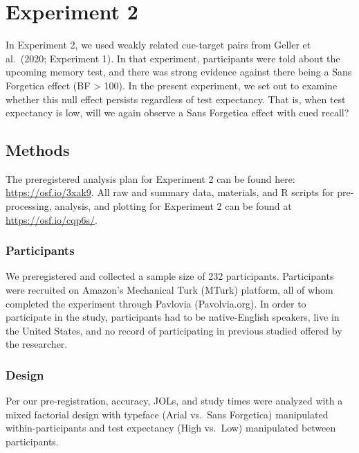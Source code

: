 \documentclass[
  english,
  jou]{apa7}
\begin{document}
\hypertarget{experiment-2}{%
\section{Experiment 2}\label{experiment-2}}

In Experiment 2, we used weakly related cue-target pairs from Geller et al.~(2020; Experiment 1). In that experiment, participants were told about the upcoming memory test, and there was strong evidence against there being a Sans Forgetica effect (BF \textgreater{} 100). In the present experiment, we set out to examine whether this null effect persists regardless of test expectancy. That is, when test expectancy is low, will we again observe a Sans Forgetica effect with cued recall?

\hypertarget{methods}{%
\subsection{Methods}\label{methods}}

The preregistered analysis plan for Experiment 2 can be found here: \url{https://osf.io/3xak9}. All raw and summary data, materials, and R scripts for pre-processing, analysis, and plotting for Experiment 2 can be found at \url{https://osf.io/cqp6s/}.

\hypertarget{participants-1}{%
\subsubsection{Participants}\label{participants-1}}

We preregistered and collected a sample size of 232 participants. Participants were recruited on Amazon's Mechanical Turk (MTurk) platform, all of whom completed the experiment through Pavlovia (Pavolvia.org). In order to participate in the study, participants had to be native-English speakers, live in the United States, and no record of participating in previous studied offered by the researcher.

\hypertarget{design-1}{%
\subsubsection{Design}\label{design-1}}

Per our pre-registration, accuracy, JOLs, and study times were analyzed with a mixed factorial design with typeface (Arial vs.~Sans Forgetica) manipulated within-participants and test expectancy (High vs.~Low) manipulated between participants.
\end{document}
